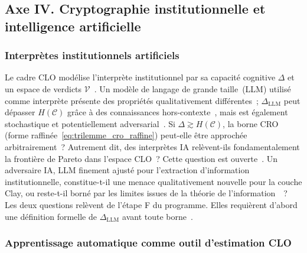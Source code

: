 \subsection{Axe IV. Cryptographie institutionnelle et intelligence artificielle}
\label{subsec:axe4_ia}
\begin{sloppypar}

\subsubsection{Interpr\`etes institutionnels artificiels}
\label{subsubsec:interpretes_artificiels}

Le cadre CLO mod\'elise l'interpr\`ete institutionnel par sa capacit\'e
cognitive $\Delta$ et un espace de verdicts $\mathcal{V}$~\cite{MINKA2026CLO,Simon82}.
Un mod\`ele de langage de grande taille~(LLM) utilis\'e comme interpr\`ete
pr\'esente des propri\'et\'es qualitativement diff\'erentes~; $\Delta_\text{LLM}$
peut d\'epasser $H(\mathcal{C})$ gr\^ace \`a des connaissances
hors-contexte~\cite{Brown2020,OpenAI2023}, mais est \'egalement stochastique
et potentiellement adversarial~\cite{Carlini2021,Zou2023}. Si $\Delta \gtrsim
H(\mathcal{C})$, la borne CRO (forme raffin\'ee~\eqref{eq:trilemme_cro_raffine}) peut-elle
\^etre approch\'ee arbitrairement~? Autrement dit, des interpr\`etes IA
rel\`event-ils fondamentalement la fronti\`ere de Pareto dans l'espace
CLO~? Cette question est ouverte~\cite{Bommasani2021}. Un adversaire IA, LLM
finement ajust\'e pour l'extraction d'information institutionnelle,
constitue-t-il une menace qualitativement nouvelle pour la couche Clay, ou
reste-t-il born\'e par les limites issues de la th\'eorie de
l'information~\cite{CoverThomas06}~? Les deux questions rel\`event de l'\'etape F
du programme. Elles requi\`erent d'abord une d\'efinition formelle de
$\Delta_\text{LLM}$ avant toute borne~\cite{Weidinger2023}.

\subsubsection{Apprentissage automatique comme outil d'estimation CLO}
\label{subsubsec:apprentissage_estimation}


\end{sloppypar}
